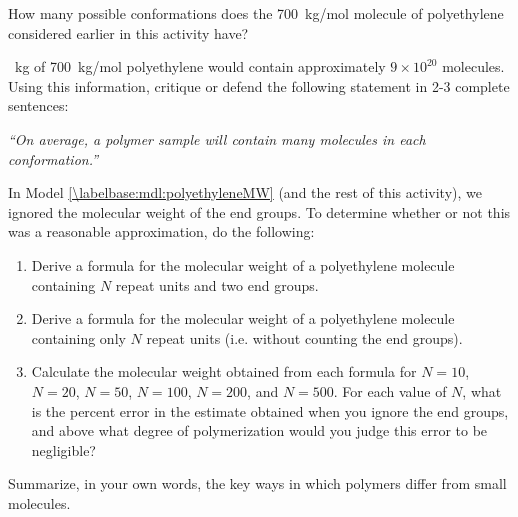 \begin{activity}
\begin{ctqs}
	\question How many possible conformations does the 700~kg/mol molecule of polyethylene considered earlier in this activity have?
	
		\begin{solution}[1in]
		\end{solution}
	
	~kg of 700~kg/mol polyethylene would contain approximately $9\times 10^{20}$ molecules.  Using this information, critique or defend the following statement in 2-3 complete sentences:
	
		\emph{``On average, a polymer sample will contain many molecules in each conformation.''}
	
		\begin{solution}[2.5in]
		\end{solution}
		
\end{ctqs}


\begin{exercises}

	\exercise In Model \ref{\labelbase:mdl:polyethyleneMW} (and the rest of this activity), we ignored the molecular weight of the end groups.  To determine whether or not this was a reasonable approximation, do the following:
	
		\begin{enumerate}
			
			\item Derive a formula for the molecular weight of a polyethylene molecule containing $N$  repeat units and two  end groups.
			
			\item Derive a formula for the molecular weight of a polyethylene molecule containing only $N$  repeat units (i.e. without counting the end groups).
			
			\item Calculate the molecular weight obtained from each formula for $N=10$, $N=20$, $N=50$, $N=100$, $N=200$, and $N=500$. For each value of $N$, what is the percent error in the estimate obtained when you ignore the end groups, and above what degree of polymerization would you judge this error to be negligible?
			
		\end{enumerate}
		
	\exercise Summarize, in your own words, the key ways in which polymers differ from small molecules.
	
\end{exercises}



	


	
\end{activity}
